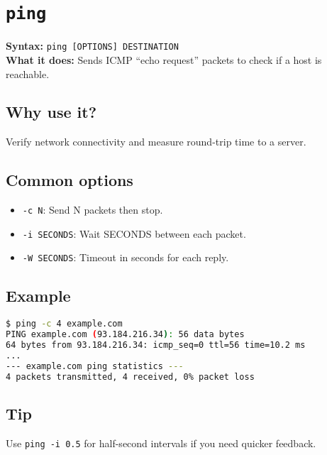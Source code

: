 \documentclass[10pt,oneside]{scrbook}
\begin{document}
\section{\texttt{ping}}
\begin{cmdbox}
  \textbf{Syntax:} \lstinline!ping [OPTIONS] DESTINATION! \\
  \textbf{What it does:} Sends ICMP “echo request” packets to check if a host is reachable.
\end{cmdbox}
\begin{commanddetails}
  \subsection*{Why use it?}
    Verify network connectivity and measure round-trip time to a server.

  \subsection*{Common options}
    \begin{itemize}
      \item \lstinline!-c N!: Send N packets then stop.
      \item \lstinline!-i SECONDS!: Wait SECONDS between each packet.
      \item \lstinline!-W SECONDS!: Timeout in seconds for each reply.
    \end{itemize}

  \subsection*{Example}
  \begin{lstlisting}[language=bash]
$ ping -c 4 example.com
PING example.com (93.184.216.34): 56 data bytes
64 bytes from 93.184.216.34: icmp_seq=0 ttl=56 time=10.2 ms
...
--- example.com ping statistics ---
4 packets transmitted, 4 received, 0% packet loss
  \end{lstlisting}

  \subsection*{Tip}
    Use \lstinline!ping -i 0.5! for half-second intervals if you need quicker feedback.
\end{commanddetails}

\end{document}
